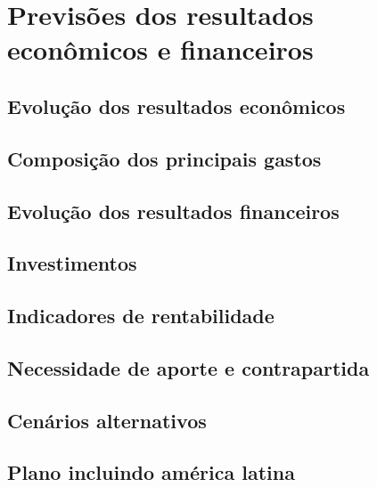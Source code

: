 \chapter{Previsões dos resultados econômicos e financeiros} 

\cite{gitman2008fundamentals}

\cite{gitman2006principios}

\section{Evolução dos resultados econômicos}

\section{Composição dos principais gastos}

\section{Evolução dos resultados financeiros}

\section{Investimentos}

\section{Indicadores de rentabilidade}

\section{Necessidade de aporte e contrapartida}

\section{Cenários alternativos}

\section{Plano incluindo américa latina}
